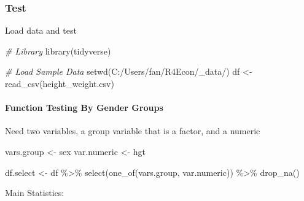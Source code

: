\documentclass[
]{book}
\newenvironment{Shaded}{\begin{snugshade}}{\end{snugshade}}
\newcommand{\AttributeTok}[1]{\textcolor[rgb]{0.77,0.63,0.00}{#1}}
\newcommand{\CommentTok}[1]{\textcolor[rgb]{0.56,0.35,0.01}{\textit{#1}}}
\newcommand{\FunctionTok}[1]{\textcolor[rgb]{0.00,0.00,0.00}{#1}}
\newcommand{\NormalTok}[1]{#1}
\newcommand{\OtherTok}[1]{\textcolor[rgb]{0.56,0.35,0.01}{#1}}
\newcommand{\SpecialCharTok}[1]{\textcolor[rgb]{0.00,0.00,0.00}{#1}}
\newcommand{\StringTok}[1]{\textcolor[rgb]{0.31,0.60,0.02}{#1}}
\begin{document}
\hypertarget{test}{%
\subsubsection{Test}\label{test}}

Load data and test

\begin{Shaded}
\begin{Highlighting}[]
\CommentTok{\# Library}
\FunctionTok{library}\NormalTok{(tidyverse)}

\CommentTok{\# Load Sample Data}
\FunctionTok{setwd}\NormalTok{(}\StringTok{\textquotesingle{}C:/Users/fan/R4Econ/\_data/\textquotesingle{}}\NormalTok{)}
\NormalTok{df }\OtherTok{\textless{}{-}} \FunctionTok{read\_csv}\NormalTok{(}\StringTok{\textquotesingle{}height\_weight.csv\textquotesingle{}}\NormalTok{)}
\end{Highlighting}
\end{Shaded}

\hypertarget{function-testing-by-gender-groups}{%
\paragraph{Function Testing By Gender Groups}\label{function-testing-by-gender-groups}}

Need two variables, a group variable that is a factor, and a numeric

\begin{Shaded}
\begin{Highlighting}[]
\NormalTok{vars.group }\OtherTok{\textless{}{-}} \StringTok{\textquotesingle{}sex\textquotesingle{}}
\NormalTok{var.numeric }\OtherTok{\textless{}{-}} \StringTok{\textquotesingle{}hgt\textquotesingle{}}
\end{Highlighting}
\end{Shaded}

\begin{Shaded}
\begin{Highlighting}[]
\NormalTok{df.select }\OtherTok{\textless{}{-}}\NormalTok{ df }\SpecialCharTok{\%\textgreater{}\%} \FunctionTok{select}\NormalTok{(}\FunctionTok{one\_of}\NormalTok{(vars.group, var.numeric)) }\SpecialCharTok{\%\textgreater{}\%} \FunctionTok{drop\_na}\NormalTok{()}
\end{Highlighting}
\end{Shaded}

Main Statistics:

\begin{Shaded}
\end{Shaded}
\end{document}
